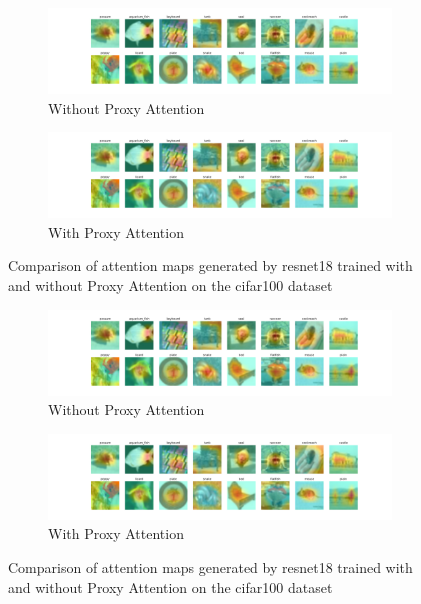 
    \begin{figure}[!htb]
        \centering
        \begin{subfigure}[b]{1\textwidth}
            \includegraphics[width=\textwidth]{images/cifar100_resnet18_noproxy_0.pdf}
            \caption{Without Proxy Attention}
        \end{subfigure}
        \hfill
        \begin{subfigure}[b]{1\textwidth}
            \includegraphics[width=\textwidth]{images/cifar100_resnet18_proxy_0.pdf}
            \caption{With Proxy Attention}
        \end{subfigure}
        \caption{Comparison of attention maps generated by resnet18 trained with and without Proxy Attention on the cifar100 dataset}
    \end{figure}
    

    \begin{figure}[!htb]
        \centering
        \begin{subfigure}[b]{1\textwidth}
            \includegraphics[width=\textwidth]{images/cifar100_resnet18_noproxy_0.pdf}
            \caption{Without Proxy Attention}
        \end{subfigure}
        \hfill
        \begin{subfigure}[b]{1\textwidth}
            \includegraphics[width=\textwidth]{images/cifar100_resnet18_proxy_0.pdf}
            \caption{With Proxy Attention}
        \end{subfigure}
        \caption{Comparison of attention maps generated by resnet18 trained with and without Proxy Attention on the cifar100 dataset}
    \end{figure}
    

